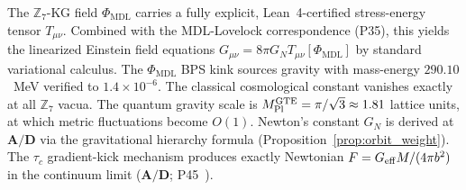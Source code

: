 \documentclass[11pt]{article}
\theoremstyle{remark}
\newcommand{\GTE}{\text{GTE}}
\newcommand{\PHIMDL}{\Phi_{\mathrm{MDL}}}
\newcommand{\ZS}{\mathbb{Z}_7}
\newcommand{\CatAD}{\textbf{A/D}}
\newcommand{\Tmunu}{T_{\mu\nu}}
\newcommand{\Gmunu}{G_{\mu\nu}}
\newcommand{\GN}{G_N}
\newcommand{\MPltot}{M_{\rm Pl}^{\GTE}}
\begin{document}
\begin{tcolorbox}[colback=green!4,colframe=green!45!black,
  title={\textbf{Central result}},
  fonttitle=\bfseries,left=6pt,right=6pt,top=4pt,bottom=4pt]
\small
The $\ZS$-KG field $\PHIMDL$ carries a fully explicit, Lean~4-certified
stress-energy tensor $\Tmunu$.  Combined with the MDL-Lovelock correspondence
(P35), this yields the linearized Einstein field equations
$\Gmunu = 8\pi\GN\Tmunu[\PHIMDL]$ by standard variational calculus.
The $\PHIMDL$ BPS kink sources gravity with mass-energy $290.10$~MeV verified to
$1.4\times10^{-6}$.  The classical cosmological constant vanishes exactly at all
$\ZS$ vacua.  The quantum gravity scale is $\MPltot = \pi/\sqrt{3}\approx1.81$
lattice units, at which metric fluctuations become $O(1)$.
Newton's constant $\GN$ is derived at $\CatAD$ via the gravitational hierarchy formula (Proposition~\ref{prop:orbit_weight}).
The $\tau_c$ gradient-kick mechanism produces exactly Newtonian $F = G_{\rm eff}M/(4\pi b^2)$
in the continuum limit ($\CatAD$; P45~\cite{SpivackCMCA}).
\end{tcolorbox}

\medskip
\end{document}
